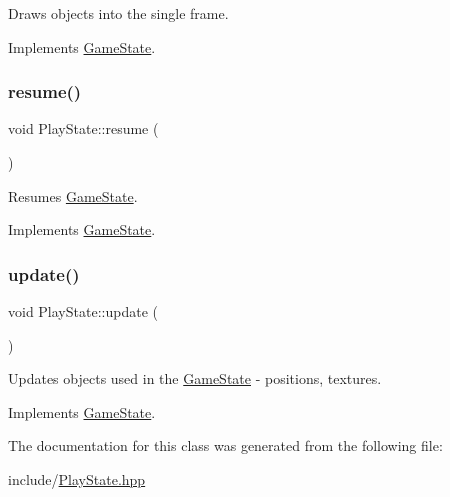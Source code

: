 Draws objects into the single frame. 



Implements \mbox{\hyperlink{class_game_state_a0d56cd5355f59a87cf95e1c6d719f329}{Game\+State}}.

\mbox{\label{class_play_state_ad4dda6c0b72ce34bd9caaade8a5562b9}} 
\subsubsection{\texorpdfstring{resume()}{resume()}}
{\footnotesize\ttfamily void Play\+State\+::resume (\begin{DoxyParamCaption}{ }\end{DoxyParamCaption})\hspace{0.3cm}{\ttfamily [virtual]}}



Resumes \mbox{\hyperlink{class_game_state}{Game\+State}}. 



Implements \mbox{\hyperlink{class_game_state_a4a421c44f4dae6e9a4fbe10b6e8c47ac}{Game\+State}}.

\mbox{\label{class_play_state_ad784c6b3e75c68505df30d51ebce4523}} 
\subsubsection{\texorpdfstring{update()}{update()}}
{\footnotesize\ttfamily void Play\+State\+::update (\begin{DoxyParamCaption}\item[{\mbox{\hyperlink{class_game_engine}{Game\+Engine}} $\ast$}]{ }\end{DoxyParamCaption})\hspace{0.3cm}{\ttfamily [virtual]}}



Updates objects used in the \mbox{\hyperlink{class_game_state}{Game\+State}} -\/ positions, textures. 



Implements \mbox{\hyperlink{class_game_state_a66b11afe355a9479f94aaf76576980bd}{Game\+State}}.



The documentation for this class was generated from the following file\+:\begin{DoxyCompactItemize}
\item 
include/\mbox{\hyperlink{_play_state_8hpp}{Play\+State.\+hpp}}\end{DoxyCompactItemize}

